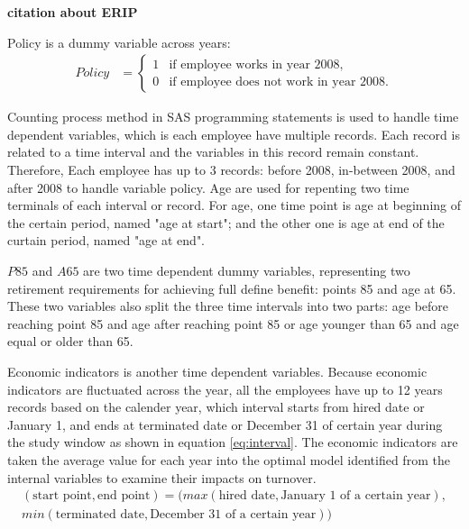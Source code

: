 \documentclass[12pt,letterpaper]{article}
\begin{document}
{\bf citation about ERIP}

Policy is a dummy variable across years:
\begin{align*}
Policy&=
\begin{cases}
1   &\text{if employee works in year 2008,}\\
0   &\text{if  employee does not work in year 2008.}
\end{cases}
\end{align*}

Counting process method in SAS programming statements is used to handle time dependent variables, which is each employee have multiple records. Each record is related to a time interval and the variables in this record remain constant.
Therefore, Each employee has up to 3 records: before 2008, in-between 2008, and after 2008 to handle variable policy. Age are used for repenting two time terminals of each interval or record. For age, one time point is age at beginning of the certain period, named "age at start"; and the other one is age at end of the curtain period, named "age at end".

$P85$ and $A65$ are two time dependent dummy variables, representing two retirement requirements for achieving full define benefit: points 85 and age at 65. These two variables also split the three time intervals into two parts: age before reaching point 85 and age after reaching point 85 or age younger than 65 and age equal or older than 65. 
 
Economic indicators is another time dependent variables. Because economic indicators are fluctuated across the year, all the employees have up to 12 years records based on the calender year, which interval starts from hired date or January 1, and ends at terminated date or December 31 of certain year during the study window as shown in equation \ref{eq:interval}. The economic indicators are taken the average value for each year into the optimal model identified from the internal variables to examine their impacts on turnover.
\begin{equation}
\label{eq:interval}
\begin{split}
(\text{start point}, \text{end point})= (max(\text{hired date}, \text{January 1 of a certain year}),\\
min(\text{terminated date}, \text{December 31 of a certain year}))
\end{split}
\end{equation}
\end{document}
